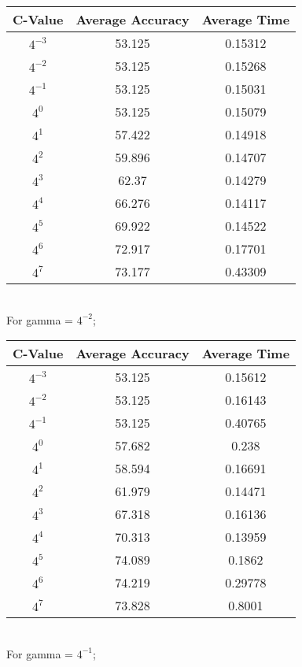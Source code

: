 \documentclass[letter,11pt]{article}
\begin{document}
\begin{tabular}{|c| c |c |} 
	\hline
	C-Value & Average Accuracy & Average Time \\ [0.5ex] 			
	\hline
	$4^{-3}$ & 53.125  & 0.15312 \\ [0.5ex] 
	\hline
	$4^{-2}$ & 53.125 & 0.15268  \\ 
	\hline
	$4^{-1}$ &  53.125 	  & 0.15031\\
	\hline
	$4^{0}$ &  53.125  & 0.15079\\
	\hline
	$4^{1}$ & 57.422  & 0.14918\\
	\hline
	$4^{2}$ & 59.896  & 0.14707\\
	\hline
	$4^{3}$ &   62.37 & 0.14279\\
	\hline
	$4^{4}$ &  66.276  & 0.14117\\
	\hline
	$4^{5}$ &   69.922  & 0.14522\\
	\hline
	$4^{6}$ &  72.917   & 0.17701\\
	\hline
	$4^{7}$ & 73.177 & 0.43309\\
	\hline	
\end{tabular}\\

For gamma = $4^{-2}$;

\begin{tabular}{|c| c |c |} 
	\hline
	C-Value & Average Accuracy & Average Time \\ [0.5ex] 			
	\hline
	$4^{-3}$ & 53.125  & 0.15612 \\ [0.5ex] 
	\hline
	$4^{-2}$ & 53.125 & 0.16143  \\ 
	\hline
	$4^{-1}$ &  53.125 	  & 0.40765\\
	\hline
	$4^{0}$ &  57.682  & 0.238\\
	\hline
	$4^{1}$ & 58.594  & 0.16691\\
	\hline
	$4^{2}$ & 61.979   & 0.14471\\
	\hline
	$4^{3}$ &   67.318 & 0.16136\\
	\hline
	$4^{4}$ &  70.313  & 0.13959\\
	\hline
	$4^{5}$ &   74.089   & 0.1862\\
	\hline
	$4^{6}$ &  74.219   & 0.29778\\
	\hline
	$4^{7}$ &  73.828 & 0.8001\\
	\hline	
\end{tabular}\\

For gamma = $4^{-1}$;
\end{document}
